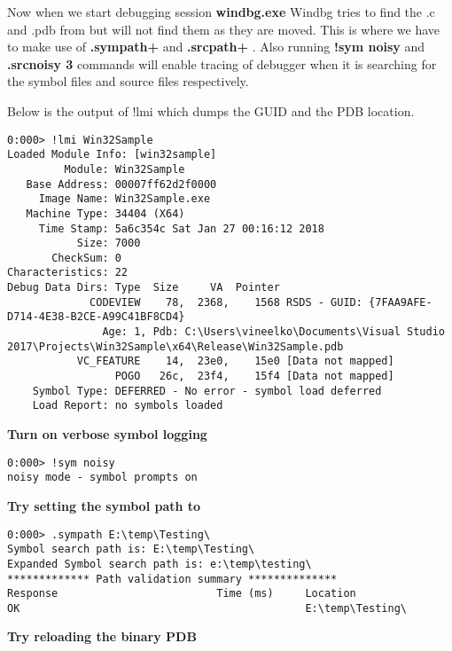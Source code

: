 \documentclass{article}
\begin{document}
Now when we start debugging session \textbf{windbg.exe } Windbg tries to find the .c and .pdb from \textbf{} but will not find them as they are moved. This is where we have to make use of \textbf{.sympath+ } and \textbf{.srcpath+ }. Also running \textbf{!sym noisy} and \textbf{.srcnoisy 3} commands will enable tracing of debugger when it is searching for the symbol files and source files respectively.

Below is the output of !lmi which dumps the GUID and the PDB location.
\begin{verbatim}
0:000> !lmi Win32Sample
Loaded Module Info: [win32sample]
         Module: Win32Sample
   Base Address: 00007ff62d2f0000
     Image Name: Win32Sample.exe
   Machine Type: 34404 (X64)
     Time Stamp: 5a6c354c Sat Jan 27 00:16:12 2018
           Size: 7000
       CheckSum: 0
Characteristics: 22
Debug Data Dirs: Type  Size     VA  Pointer
             CODEVIEW    78,  2368,    1568 RSDS - GUID: {7FAA9AFE-D714-4E38-B2CE-A99C41BF8CD4}
               Age: 1, Pdb: C:\Users\vineelko\Documents\Visual Studio 2017\Projects\Win32Sample\x64\Release\Win32Sample.pdb
           VC_FEATURE    14,  23e0,    15e0 [Data not mapped]
                 POGO   26c,  23f4,    15f4 [Data not mapped]
    Symbol Type: DEFERRED - No error - symbol load deferred
    Load Report: no symbols loaded
\end{verbatim}
\textbf{Turn on verbose symbol logging}
\begin{verbatim}
0:000> !sym noisy
noisy mode - symbol prompts on
\end{verbatim}
\textbf{Try setting the symbol path to }
\begin{verbatim}
0:000> .sympath E:\temp\Testing\
Symbol search path is: E:\temp\Testing\
Expanded Symbol search path is: e:\temp\testing\
************* Path validation summary **************
Response                         Time (ms)     Location
OK                                             E:\temp\Testing\
\end{verbatim}
\textbf{Try reloading the binary PDB}
\end{document}
